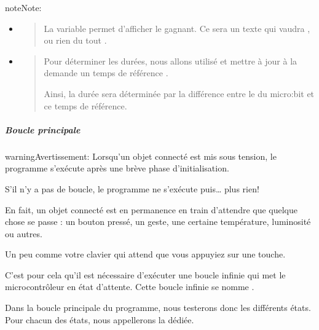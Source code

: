 \documentclass[letterpaper,10pt,french]{sphinxmanual}
\begin{document}
\begin{sphinxadmonition}{note}{Note:}\begin{itemize}
\item {} 
\begin{quote}

La variable  permet d’afficher le gagnant.
Ce sera un texte qui vaudra ,  ou rien du tout .
\end{quote}

\item {} 
\begin{quote}

Pour déterminer les durées, nous allons utilisé et mettre à jour
à la demande un temps de référence .

Ainsi, la durée sera déterminée par
la différence entre le  du micro:bit
et ce temps de référence.
\end{quote}

\end{itemize}
\end{sphinxadmonition}


\subparagraph{Boucle principale}
\label{\detokenize{projets/goFast-bloc-coder:boucle-principale}}
\begin{sphinxadmonition}{warning}{Avertissement:}
Lorsqu’un objet connecté est mis sous tension, le programme
s’exécute après une brève phase d’initialisation.

S’il n’y a pas de boucle, le programme ne s’exécute  puis… plus rien!

En fait, un objet connecté est en permanence en train d’attendre
que quelque chose se passe : un bouton pressé, un geste, une
certaine température, luminosité ou autres.

Un peu comme votre clavier qui attend  que vous
appuyiez sur une touche.

C’est pour cela qu’il est nécessaire d’exécuter une boucle infinie
qui met le microcontrôleur en état d’attente. Cette boucle infinie
se nomme .
\end{sphinxadmonition}

Dans la boucle principale du programme, nous testerons donc
les différents états. Pour chacun des états, nous appellerons
la  dédiée.
\end{document}
